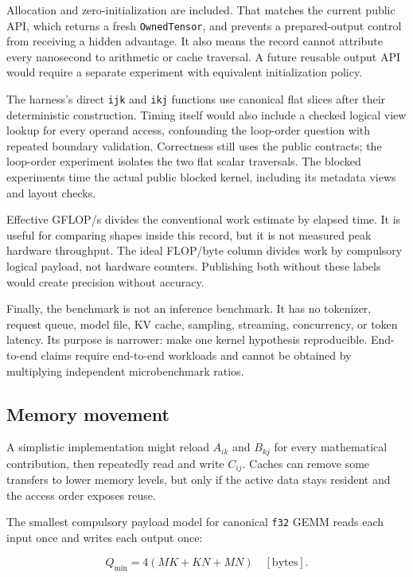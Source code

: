 \documentclass[
  10pt,
]{article}
\begin{document}
Allocation and zero-initialization are included. That matches the
current public API, which returns a fresh \texttt{OwnedTensor}, and
prevents a prepared-output control from receiving a hidden advantage. It
also means the record cannot attribute every nanosecond to arithmetic or
cache traversal. A future reusable output API would require a separate
experiment with equivalent initialization policy.

The harness's direct \texttt{ijk} and \texttt{ikj} functions use
canonical flat slices after their deterministic construction. Timing
\texttt{} itself would also include a
checked logical view lookup for every operand access, confounding the
loop-order question with repeated boundary validation. Correctness still
uses the public contracts; the loop-order experiment isolates the two
flat scalar traversals. The blocked experiments time the actual public
blocked kernel, including its metadata views and layout checks.

Effective GFLOP/s divides the conventional work estimate by elapsed
time. It is useful for comparing shapes inside this record, but it is
not measured peak hardware throughput. The ideal FLOP/byte column
divides work by compulsory logical payload, not hardware counters.
Publishing both without these labels would create precision without
accuracy.

Finally, the benchmark is not an inference benchmark. It has no
tokenizer, request queue, model file, KV cache, sampling, streaming,
concurrency, or token latency. Its purpose is narrower: make one kernel
hypothesis reproducible. End- to-end claims require end-to-end workloads
and cannot be obtained by multiplying independent microbenchmark ratios.

\subsection{Memory movement}\label{memory-movement}

A simplistic implementation might reload \(A_{ik}\) and \(B_{kj}\) for
every mathematical contribution, then repeatedly read and write
\(C_{ij}\). Caches can remove some transfers to lower memory levels, but
only if the active data stays resident and the access order exposes
reuse.

The smallest compulsory payload model for canonical \texttt{f32} GEMM
reads each input once and writes each output once:

\[
Q_{\min}=4(MK+KN+MN)\quad[\mathrm{bytes}].
\]
\end{document}
